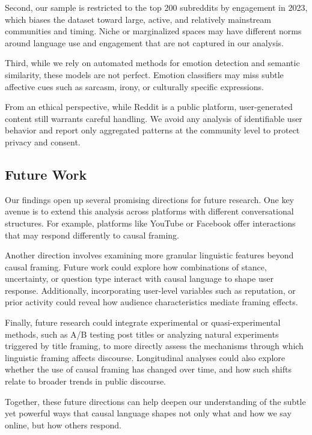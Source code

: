 \documentclass[acmsmall]{acmart}
\begin{document}
Second, our sample is restricted to the top 200 subreddits by engagement in 2023, which biases the dataset toward large, active, and relatively mainstream communities and timing. Niche or marginalized spaces may have different norms around language use and engagement that are not captured in our analysis.

Third, while we rely on automated methods for emotion detection and semantic similarity, these models are not perfect. Emotion classifiers may miss subtle affective cues such as sarcasm, irony, or culturally specific expressions. 

From an ethical perspective, while Reddit is a public platform, user-generated content still warrants careful handling. We avoid any analysis of identifiable user behavior and report only aggregated patterns at the community level to protect privacy and consent.



\subsection{Future Work}

Our findings open up several promising directions for future research. One key avenue is to extend this analysis across platforms with different conversational structures. For example, platforms like YouTube or Facebook offer interactions that may respond differently to causal framing. 

Another direction involves examining more granular linguistic features beyond causal framing. Future work could explore how combinations of stance, uncertainty, or question type interact with causal language to shape user response. Additionally, incorporating user-level variables such as reputation, or prior activity could reveal how audience characteristics mediate framing effects.

Finally, future research could integrate experimental or quasi-experimental methods, such as A/B testing post titles or analyzing natural experiments triggered by title framing, to more directly assess the mechanisms through which linguistic framing affects discourse. Longitudinal analyses could also explore whether the use of causal framing has changed over time, and how such shifts relate to broader trends in public discourse.

Together, these future directions can help deepen our understanding of the subtle yet powerful ways that causal language shapes not only what and how we say online, but how others respond.
\end{document}
